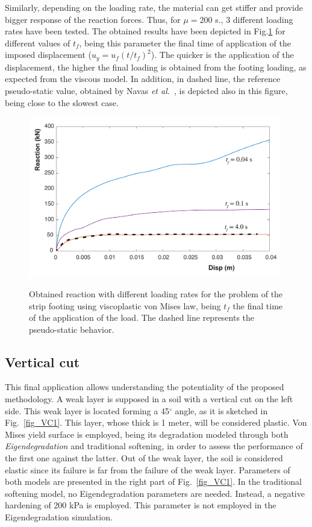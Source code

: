 \documentclass[applsci,journal,article,submit,moreauthors,pdftex]{Definitions/mdpi}
\begin{document}
Similarly, depending on the loading rate, the material can get stiffer and provide bigger response of the reaction forces. Thus, for $\mu=200$ s., 3 different loading rates have been tested. The obtained results have been depicted in Fig.\ref{visco2} for different values of $t_f$, being this parameter the final time of application of the imposed displacement ($u_y=u_f\left(t/t_f\right)^2$). The quicker is the application of the displacement, the higher the final loading is obtained from the footing loading, as expected from the viscous model. In addition, in dashed line, the reference pseudo-static value, obtained by Navas \textit{et al.}~\cite{Navas2018}, is depicted also in this figure, being close to the slowest case.

\begin{figure}
\begin{center}
\includegraphics[width=11cm]{Figs/visco_t.pdf}\\
\caption{Obtained reaction with different loading rates for the problem of the strip footing using viscoplastic von Mises law, being $t_f$ the final time of the application of the load. The dashed line represents the pseudo-static behavior.}
\label{visco2}
\end{center}
\end{figure}

\subsection{Vertical cut}
This final application allows understanding the potentiality of the proposed methodology. A weak layer is supposed in a soil with a vertical cut on the left side. This weak layer is located forming a 45$^\circ$ angle, as it is sketched in Fig.~\ref{fig_VC1}. This layer, whose thick is 1 meter, will be considered plastic. Von Mises yield surface is employed, being its degradation modeled through both \emph{Eigendegradation} and traditional softening, in order to assess the performance of the first one against the latter. Out of the weak layer, the soil is considered elastic since its failure is far from the failure of the weak layer. Parameters of both models are presented in the right part of Fig.~\ref{fig_VC1}. In the traditional softening model, no Eigendegradation parameters are needed. Instead, a negative hardening of 200 kPa is employed. This parameter is not employed in the Eigendegradation simulation.
\end{document}
